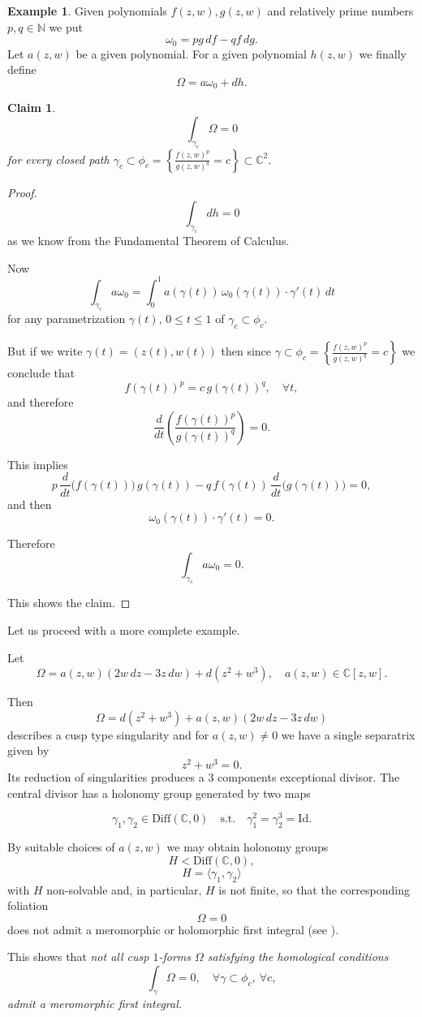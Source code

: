 \documentclass[11pt,a4paper]{amsart}
\newtheorem{claim}[theorem]{Claim}
\theoremstyle{definition}
\newtheorem{example}[theorem]{Example}
\begin{document}
\begin{example}
Given polynomials $f(z,w),g(z,w)$ and relatively prime numbers
$p,q\in\mathbb{N}$ we put
\[
\omega_0 = p g\,df - q f\,dg.
\]
Let $a(z,w)$ be a given polynomial.
For a given polynomial $h(z,w)$ we finally define
\[
\Omega = a \omega_0 + dh.
\]

\begin{claim}
\[
\int_{\gamma_c}\Omega = 0
\]
for every closed path $\gamma_c \subset \phi_c
=
\left\{\frac{f(z,w)^p}{g(z,w)^q}=c\right\}
\subset \mathbb{C}^2.
$
\end{claim}
\begin{proof}
\[
\int_{\gamma_c} dh = 0
\]
as we know from the Fundamental Theorem of Calculus.

Now
\[
\int_{\gamma_c} a \omega_0
=
\int_0^1
a(\gamma(t))\, \omega_0(\gamma(t))\cdot \gamma'(t)\, dt
\]
for any parametrization $\gamma(t)$, $0\le t\le1$ of $\gamma_c\subset\phi_c$.

But if we write $\gamma(t)=(z(t),w(t))$
then since $\gamma\subset\phi_c
=
\left\{\frac{f(z,w)^p}{g(z,w)^q}=c\right\}$
we conclude that
\[
f(\gamma(t))^p = c\, g(\gamma(t))^q,
\quad \forall t,
\]
and therefore
\[
\frac{d}{dt}
\left(
\frac{f(\gamma(t))^p}{g(\gamma(t))^q}
\right)=0.
\]

This implies
\[
p\,\frac{d}{dt}\big(f(\gamma(t))\big)\,g(\gamma(t))
-
q\,f(\gamma(t))\,\frac{d}{dt}\big(g(\gamma(t))\big)
=0,
\]
and then
\[
\omega_0(\gamma(t))\cdot \gamma'(t)=0.
\]

Therefore
\[
\int_{\gamma_c} a \omega_0 = 0.
\]

This shows the claim.
\end{proof}


Let us  proceed with a more complete example.

Let
\[
\Omega = a(z,w)(2w\,dz-3z\,dw) + d(z^2+w^3),
\quad a(z,w)\in\mathbb{C}[z,w].
\]

Then
\[
\Omega = d(z^2+w^3) + a(z,w)(2w\,dz-3z\,dw)
\]
describes a cusp type singularity
and for $a(z,w)\neq0$ we have a single separatrix
given by
\[
z^2+w^3=0.
\]
Its reduction of singularities produces
a $3$ components exceptional divisor.
The central divisor has a holonomy group generated by two maps

\[
\gamma_1,\gamma_2\in \mathrm{Diff}(\mathbb{C},0)
\quad\text{s.t.}\quad
\gamma_1^2=\gamma_2^3=\mathrm{Id}.
\]

By suitable choices of $a(z,w)$ we may obtain holonomy
groups
\[
H<\mathrm{Diff}(\mathbb{C},0),
\]
\[
H=\langle\gamma_1,\gamma_2\rangle
\]
with $H$ non-solvable
and, in particular, $H$ is not finite,
so that the corresponding foliation
\[
\Omega=0
\]
does not admit a meromorphic
or holomorphic first integral (see \cite{mattei-moussu}).

This shows that {\em not all cusp  $1$-forms $\Omega$
satisfying the homological conditions
\[
\int_{\gamma}\Omega=0,
\quad \forall\gamma\subset\phi_c,\ \forall c,
\]
admit a meromorphic first integral.}
\end{example}
\end{document}
